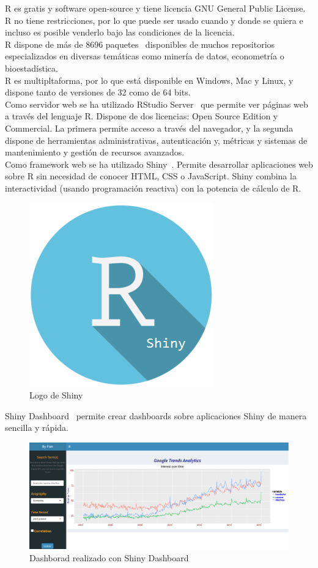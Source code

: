 R es gratis y software open-source y tiene licencia GNU General Public License. R no tiene restricciones, por lo que puede ser usado cuando y donde se quiera e incluso es posible venderlo bajo las condiciones de la licencia.\\

R dispone de más de 8696 paquetes~\cite{Rpaquetes} disponibles de muchos repositorios especializados en diversas temáticas como minería de datos, econometría o bioestadística.\\

R es multipltaforma, por lo que está disponible en Windows, Mac y Linux, y dispone tanto de versiones de 32 como de 64 bits.\\

Como servidor web se ha utilizado RStudio Server~\cite{RStudioServer} que permite ver páginas web a través del lenguaje R. Dispone de dos licencias: Open Source Edition y Commercial. La primera permite acceso a través del navegador, y la segunda dispone de herramientas administrativas, autenticación y, métricas y sistemas de mantenimiento y gestión de recursos avanzados.\\

Como framework web se ha utilizado Shiny~\cite{Shiny}. Permite desarrollar aplicaciones web sobre R sin necesidad de conocer HTML, CSS o JavaScript. Shiny combina la interactividad (usando programación reactiva) con la potencia de cálculo de R.\\

\begin{figure}[htbp!]
	\centering
	\includegraphics[width=0.3\linewidth]{imagenes/RShiny}
	\caption{Logo de Shiny}
	\label{fig:RShiny}
\end{figure}

Shiny Dashboard~\cite{ShinyDashboard} permite crear dashboards sobre aplicaciones Shiny de manera sencilla y rápida.\\

\begin{figure}
\centering
\includegraphics[width=0.7\linewidth]{imagenes/shinydashboard}
\caption{Dashborad realizado con Shiny Dashboard}
\label{fig:shinydashboard}
\end{figure}

